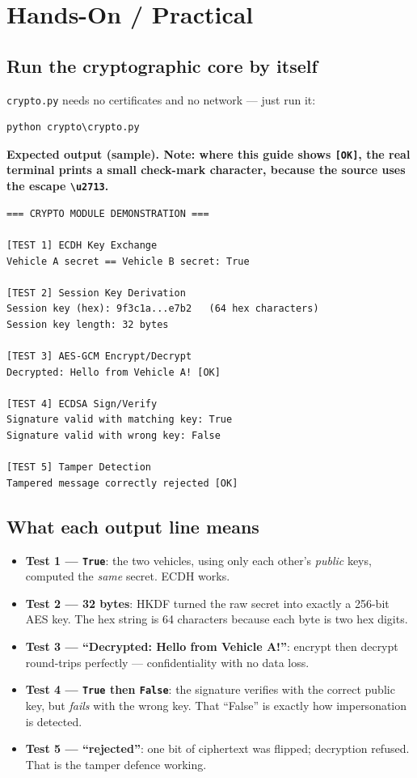 \documentclass[11pt,a4paper]{article}
\begin{document}
\section{Hands-On / Practical}

\subsection{Run the cryptographic core by itself}
\texttt{crypto.py} needs no certificates and no network --- just run it:
\begin{lstlisting}[style=term]
python crypto\crypto.py
\end{lstlisting}

\noindent\textbf{Expected output (sample). Note: where this guide shows
\texttt{[OK]}, the real terminal prints a small check-mark character, because the
source uses the escape \texttt{\textbackslash u2713}.}
\begin{lstlisting}[style=term]
=== CRYPTO MODULE DEMONSTRATION ===

[TEST 1] ECDH Key Exchange
Vehicle A secret == Vehicle B secret: True

[TEST 2] Session Key Derivation
Session key (hex): 9f3c1a...e7b2   (64 hex characters)
Session key length: 32 bytes

[TEST 3] AES-GCM Encrypt/Decrypt
Decrypted: Hello from Vehicle A! [OK]

[TEST 4] ECDSA Sign/Verify
Signature valid with matching key: True
Signature valid with wrong key: False

[TEST 5] Tamper Detection
Tampered message correctly rejected [OK]
\end{lstlisting}

\subsection{What each output line means}
\begin{itemize}
  \item \textbf{Test 1 --- \texttt{True}}: the two vehicles, using only each
        other's \emph{public} keys, computed the \emph{same} secret. ECDH works.
  \item \textbf{Test 2 --- 32 bytes}: HKDF turned the raw secret into exactly a
        256-bit AES key. The hex string is 64 characters because each byte is two
        hex digits.
  \item \textbf{Test 3 --- ``Decrypted: Hello from Vehicle A!''}: encrypt then
        decrypt round-trips perfectly --- confidentiality with no data loss.
  \item \textbf{Test 4 --- \texttt{True} then \texttt{False}}: the signature
        verifies with the correct public key, but \emph{fails} with the wrong
        key. That ``False'' is exactly how impersonation is detected.
  \item \textbf{Test 5 --- ``rejected''}: one bit of ciphertext was flipped;
        decryption refused. That is the tamper defence working.
\end{itemize}
\end{document}
